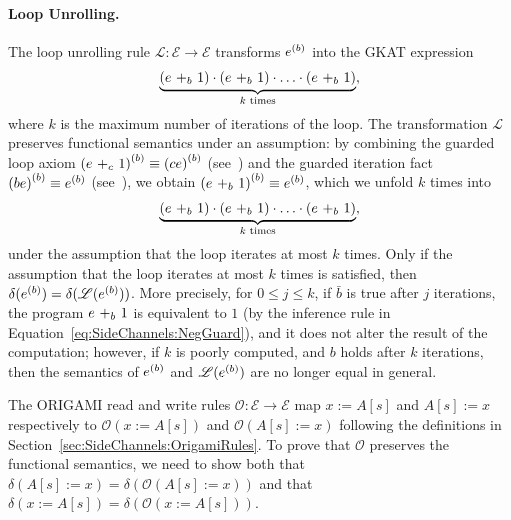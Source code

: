 \paragraph{Loop Unrolling.} The loop unrolling rule $\mathscr{L}\colon \mathscr{E}\rightarrow \mathscr{E}$ transforms $\iterate{b}{e}$ into the GKAT expression 
\begin{align*}
    \underbrace{\left(\branch{b}{e}{1}\right)\cdot\left(\branch{b}{e}{1}\right)\cdot\ldots\cdot\left(\branch{b}{e}{1}\right)}_\text{$k$ times},
\end{align*}
where $k$ is the maximum number of iterations of the loop. The transformation $\mathscr{L}$ preserves functional semantics under an assumption: by combining the guarded loop axiom $\iterate{b}{(\branch{c}{e}{1})}\equiv \iterate{b}{(ce)}$ (see~\cite[Figure 1, W2]{GKAT}) and the guarded iteration fact $\iterate{b}{(be)}\equiv \iterate{b}{e}$ (see~\cite[Figure 2, W4']{GKAT}), we obtain $\iterate{b}{(\branch{b}{e}{1})}\equiv \iterate{b}{e}$, which we unfold $k$ times into 
\begin{align*}
    \underbrace{\left(\branch{b}{e}{1}\right)\cdot\left(\branch{b}{e}{1}\right)\cdot\ldots\cdot\left(\branch{b}{e}{1}\right)}_\text{$k$ times},
\end{align*}
under the assumption that the loop iterates at most $k$ times. Only if the assumption that the loop iterates at most $k$ times is satisfied, then $\delta(\iterate{b}{e})=\delta(\mathscr{L}(\iterate{b}{e}))$. More precisely, for $0\leq j\leq k$, if $\bar{b}$ is true after $j$ iterations, the program $\branch{b}{e}{1}$ is equivalent to $1$ (by the inference rule in Equation~\ref{eq:SideChannels:NegGuard}), and it does not alter the result of the computation; however, if $k$ is poorly computed, and $b$ holds after $k$ iterations, then the semantics of $\iterate{b}{e}$ and $\mathscr{L}(\iterate{b}{e})$ are no longer equal in general.

The ORIGAMI read and write rules $\mathscr{O}\colon \mathscr{E}\rightarrow \mathscr{E}$ map $x:=A[s]$ and $A[s]:=x$ respectively to $\mathscr{O}(x:=A[s])$ and $\mathscr{O}(A[s]:=x)$ following the definitions in Section~\ref{sec:SideChannels:OrigamiRules}. To prove that $\mathscr{O}$ preserves the functional semantics, we need to show both that $\delta(A[s]:=x)= \delta(\mathscr{O}(A[s]:=x))$ and that $\delta(x:=A[s])=\delta(\mathscr{O}(x:=A[s]))$.


